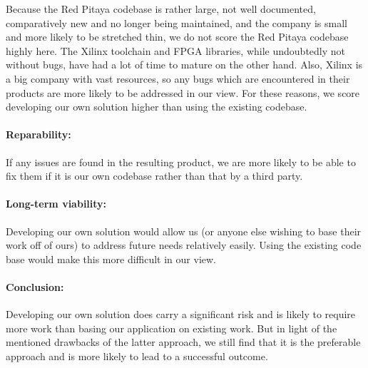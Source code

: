 Because  the  Red  Pitaya  codebase  is rather  large,  not  well  documented,
comparatively new and no longer being maintained, and the company is small and
more likely  to be  stretched thin, we  do not score  the Red  Pitaya codebase
highly here. The  Xilinx toolchain and  FPGA libraries, while  undoubtedly not
without bugs,  have had  a lot  of time to  mature on  the other  hand.  Also,
Xilinx is a big company with vast resources, so any bugs which are encountered
in  their products  are more  likely to  be addressed  in our  view. For these
reasons, we score  developing our own solution higher than  using the existing
codebase.

\paragraph{Reparability:} If any issues are found in the resulting product, we
are more likely to  be able to fix them if it is  our own codebase rather than
that by a third party.

\paragraph{Long-term viability:} Developing  our own  solution would  allow us
(or anyone  else wishing  to base their  work off of  ours) to  address future
needs relatively  easily. Using the  existing code base  would make  this more
difficult in our view.

\paragraph{Conclusion:} Developing our  own solution does carry  a significant
risk  and is  likely  to require  more  work than  basing  our application  on
existing  work.   But in  light  of  the  mentioned  drawbacks of  the  latter
approach, we still find that it is  the preferable approach and is more likely
to lead to a successful outcome.


